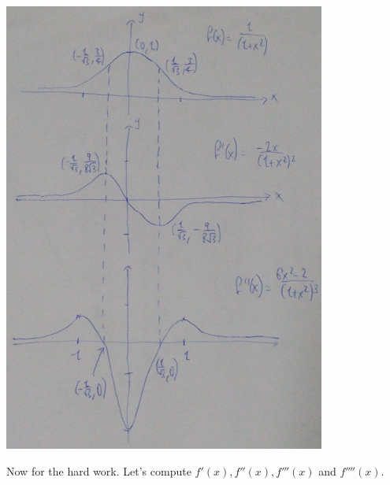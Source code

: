 \documentclass[9pt]{article}
\begin{document}
\begin{center}
  \includegraphics[]{q2.jpg}
\end{center}

Now for the hard work. Let's compute $f'(x), f''(x), f'''(x)$ and $f''''(x)$.
\end{document}
